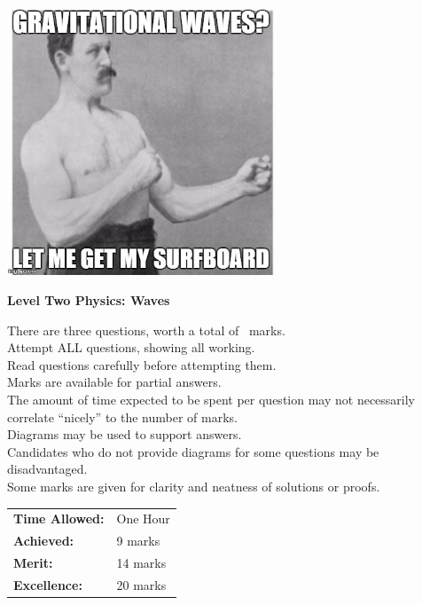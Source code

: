 \documentclass[a4paper,addpoints]{exam}
\begin{document}
\begin{coverpages}

\begin{center}
  \includegraphics[width=0.6\textwidth]{waves_cover}

  \vspace{5mm}

  \textbf{\Huge{Level Two Physics: Waves}}
\end{center}

\vspace{5mm}

\noindent
\large{There are three questions, worth a total of \numpoints\ marks.\\
       Attempt ALL questions, showing all working.\\
       Read questions carefully before attempting them.\\
       Marks are available for partial answers.\\
       The amount of time expected to be spent per question may not necessarily correlate ``nicely'' to the number of marks.\\
       Diagrams may be used to support answers.\\
       Candidates who do not provide diagrams for some questions may be disadvantaged.\\
       Some marks are given for clarity and neatness of solutions or proofs.}
\vspace{2mm}

\vfill

\begin{flushright}
  \begin{tabular}{ll}
    \textbf{Time Allowed:}& One Hour\\
    \textbf{Achieved:}& 9 marks\\
    \textbf{Merit:}& 14 marks\\
    \textbf{Excellence:}& 20 marks
  \end{tabular}

  \gradetable[v][questions]
\end{flushright}

\end{coverpages}
\end{document}

